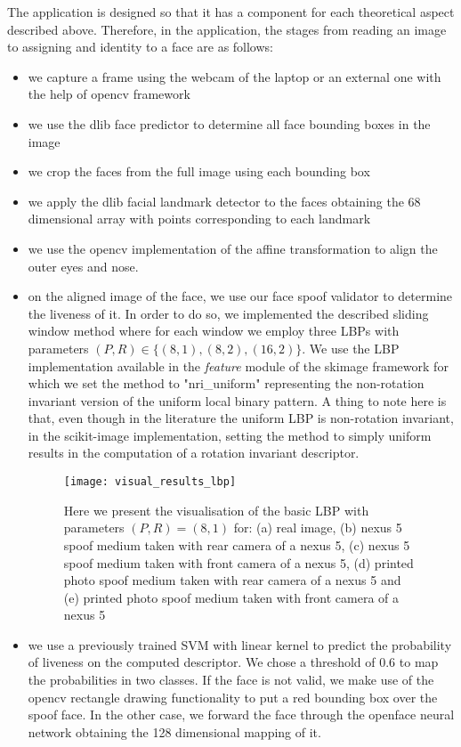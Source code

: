 The application is designed so that it has a component for each theoretical aspect described above. Therefore, in the application, the stages from reading an image to assigning and identity to a face are as follows: 
\begin{itemize}
	\item we capture a frame using the webcam of the laptop or an external one with the help of opencv framework
	\item we use the dlib \cite{dlib09} face predictor to determine all face bounding boxes in the image
	\item we crop the faces from the full image using each bounding box
	\item we apply the dlib facial landmark detector to the faces obtaining the 68 dimensional array with points corresponding to each landmark
	\item we use the opencv implementation of the affine transformation to align the outer eyes and nose.
	\item on the aligned image of the face, we use our face spoof validator to determine the liveness of it. In order to do so, we implemented the described sliding window method where for each window we employ three LBPs with parameters $(P,R) \in \{(8,1), (8,2), (16,2)\}$. We use the LBP implementation available in the \textit{feature} module of the skimage \cite{scikit-image} framework for which we set the method to "nri\_uniform" representing the non-rotation invariant version of the uniform local binary pattern. A thing to note here is that, even though in the literature the uniform LBP is non-rotation invariant, in the scikit-image \cite{scikit-image} implementation, setting the method to simply uniform results in the computation of a rotation invariant descriptor.
	\begin{figure}[H]
		\captionsetup{width=15cm,font=small}
		\begin{center}
			\texttt{[image: visual\_results\_lbp]}
			\caption[LBP feature visualisation on faces]{Here we present the visualisation of the basic LBP with parameters $(P,R) = (8,1)$ for: (a) real image, (b) nexus 5 spoof medium taken with rear camera of a nexus 5, (c) nexus 5 spoof medium taken with front camera of a nexus 5, (d) printed photo spoof medium taken with rear camera of a nexus 5 and (e) printed photo spoof medium taken with front camera of a nexus 5}
		\end{center}
		\label{fig:visual_results_lbp}
	\end{figure}
	\item we use a previously trained SVM with linear kernel to predict the probability of liveness on the computed descriptor. We chose a threshold of $0.6$ to map the probabilities in two classes. If the face is not valid, we make use of the opencv rectangle drawing functionality to put a red bounding box over the spoof face. In the other case, we forward the face through the openface neural network obtaining the 128 dimensional mapping of it.

\end{itemize}
